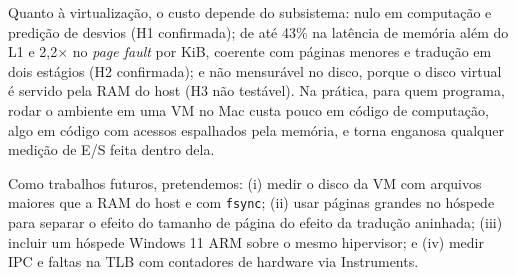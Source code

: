 \documentclass[12pt]{article}
\begin{document}
Quanto à virtualização, o custo depende do subsistema: nulo em computação e
predição de desvios (H1 confirmada); de até 43\% na latência de memória além
do L1 e 2,2$\times$ no \emph{page fault} por KiB, coerente com páginas menores e
tradução em dois estágios (H2 confirmada); e não mensurável no disco, porque o
disco virtual é servido pela RAM do host (H3 não testável). Na prática, para
quem programa, rodar o ambiente em uma VM no Mac custa pouco em código de
computação, algo em código com acessos espalhados pela memória, e torna
enganosa qualquer medição de E/S feita dentro dela.

Como trabalhos futuros, pretendemos: (i) medir o disco da VM com arquivos
maiores que a RAM do host e com \texttt{fsync}; (ii) usar páginas grandes no
hóspede para separar o efeito do tamanho de página do efeito da tradução
aninhada; (iii) incluir um hóspede Windows 11 ARM sobre o mesmo hipervisor; e
(iv) medir IPC e faltas na TLB com contadores de hardware via Instruments.



\end{document}
